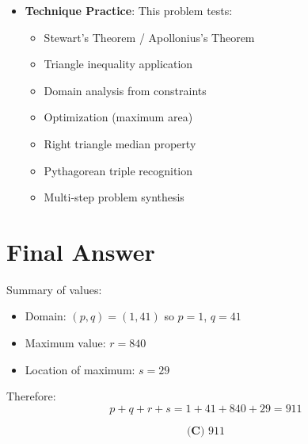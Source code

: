 \documentclass[12pt]{article}
\begin{document}
\begin{competitionbox}
\begin{itemize}[leftmargin=*]
    \item \textbf{Technique Practice}: This problem tests:
    \begin{itemize}
        \item Stewart's Theorem / Apollonius's Theorem
        \item Triangle inequality application
        \item Domain analysis from constraints
        \item Optimization (maximum area)
        \item Right triangle median property
        \item Pythagorean triple recognition
        \item Multi-step problem synthesis
    \end{itemize}
\end{itemize}
\end{competitionbox}

\section*{Final Answer}

Summary of values:
\begin{itemize}
    \item Domain: $(p, q) = (1, 41)$ so $p = 1$, $q = 41$
    \item Maximum value: $r = 840$
    \item Location of maximum: $s = 29$
\end{itemize}

Therefore:
$$p + q + r + s = 1 + 41 + 840 + 29 = 911$$

$$\boxed{\textbf{(C) } 911}$$
\end{document}
